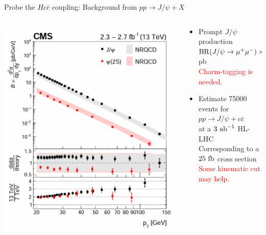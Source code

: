 \documentclass[aspectratio=169]{beamer}
\begin{document}
\begin{frame}{Probe the $Hc{\bar c}$ coupling: Background from $pp\to J/\psi +X$}
	\begin{columns}
		\begin{column}{0.45\textwidth}
			\begin{center}
				\includegraphics[width=.88\textwidth]{figs/CMS.png}
			\end{center}
		\end{column}
		\begin{column}{0.56\textwidth}
			\begin{itemize}
				\item Prompt $J/\psi$ production\\
				\hspace{1mm}${\rm BR}(J/\psi \to \mu^+\mu^-)\times\sigma(pp\to J/\psi)\simeq 860~$pb \\
				\hspace{2mm} \textcolor{red}{Charm-tagging is needed.}
				\item Estimate 75000 events for $pp \to J/\psi + c {\bar c}$ \\
				\hspace{1mm} at a $3~{\rm ab}^{-1}$ HL-LHC \\
				\hspace{1mm} Corresponding to a $25~{\rm fb}$ cross section \\
				\hspace{2mm} \textcolor{red}{Some kinematic cut may help.} 
			\end{itemize}
		\end{column}
	\end{columns}
\end{frame}
\end{document}
